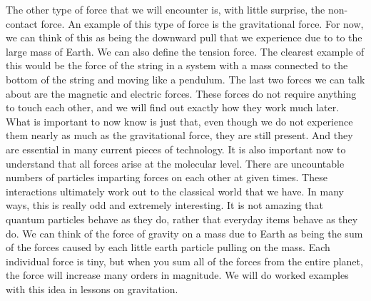 \documentclass{article}[gray]
\numberwithin{equation}{subsection}
\begin{document}
The other type of force that we will encounter is, with little surprise, the non-contact force. An example of this type of force is the gravitational force. For now, we can think of this as being the downward pull that we experience due to to the large mass of Earth. We can also define the tension force. The clearest example of this would be the force of the string in a system with a mass connected to the bottom of the string and moving like a pendulum. The last two forces we can talk about are the magnetic and electric forces. These forces do not require anything to touch each other, and we will find out exactly how they work much later. What is important to now know is just that, even though we do not experience them nearly as much as the gravitational force, they are still present. And they are essential in many current pieces of technology. It is also important now to understand that all forces arise at the molecular level. There are uncountable numbers of particles imparting forces on each other at given times. These interactions ultimately work out to the classical world that we have. In many ways, this is really odd and extremely interesting. It is not amazing that quantum particles behave as they do, rather that everyday items behave as they do. We can think of the force of gravity on a mass due to Earth as being the sum of the forces caused by each little earth particle pulling on the mass. Each individual force is tiny, but when you sum all of the forces from the entire planet, the force will increase many orders in magnitude. We will do worked examples with this idea in lessons on gravitation. 
\newline
\newline
{}
\newpage
\end{document}

